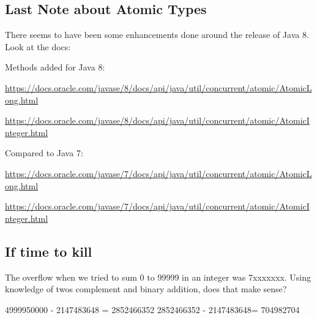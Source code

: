 \documentclass[12pt]{article}
\begin{document}
\subsection{Last Note about Atomic Types}
There seems to have been some enhancements done around the release of Java 8.
Look at the docs:

Methods added for Java 8:

\url{https://docs.oracle.com/javase/8/docs/api/java/util/concurrent/atomic/AtomicLong.html}

\url{https://docs.oracle.com/javase/8/docs/api/java/util/concurrent/atomic/AtomicInteger.html}

Compared to Java 7:

\url{https://docs.oracle.com/javase/7/docs/api/java/util/concurrent/atomic/AtomicLong.html}

\url{https://docs.oracle.com/javase/7/docs/api/java/util/concurrent/atomic/AtomicInteger.html}

\subsection{If time to kill}
The overflow when we tried to sum 0 to 99999 in an integer was 7xxxxxxx. Using
knowledge of twos complement and binary addition, does that make sense?

4999950000 - 2147483648 = 2852466352
2852466352 - 2147483648= 704982704
\end{document}
